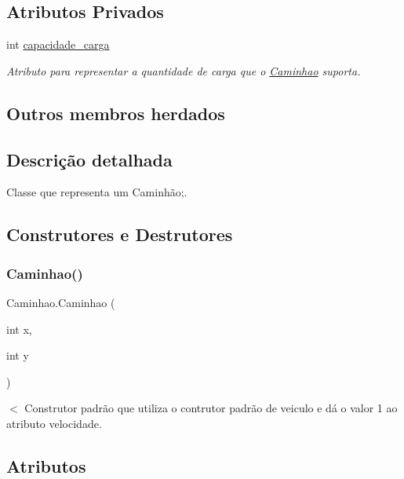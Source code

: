 \subsection*{Atributos Privados}
\begin{DoxyCompactItemize}
\item 
int \mbox{\hyperlink{class_caminhao_a684d4c04ae732540eead2f735d221e7e}{capacidade\+\_\+carga}}
\begin{DoxyCompactList}\small\item\em Atributo para representar a quantidade de carga que o \mbox{\hyperlink{class_caminhao}{Caminhao}} suporta. \end{DoxyCompactList}\end{DoxyCompactItemize}
\subsection*{Outros membros herdados}


\subsection{Descrição detalhada}
Classe que representa um Caminhão;. 

\subsection{Construtores e Destrutores}
\mbox{\label{class_caminhao_a7d012968951dc4bd2857c728dd3d0c79}} 
\subsubsection{\texorpdfstring{Caminhao()}{Caminhao()}}
{\footnotesize\ttfamily Caminhao.\+Caminhao (\begin{DoxyParamCaption}\item[{int}]{x,  }\item[{int}]{y }\end{DoxyParamCaption})}

$<$ Construtor padrão que utiliza o contrutor padrão de veiculo e dá o valor 1 ao atributo velocidade. 

\subsection{Atributos}
\mbox{\label{class_caminhao_a684d4c04ae732540eead2f735d221e7e}} 
